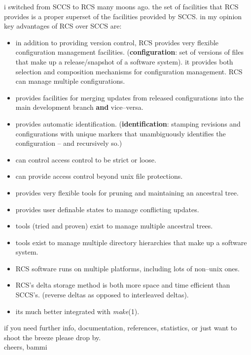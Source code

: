 
\noindent i switched from SCCS to RCS many moons ago. the set of facilities that
RCS provides is a proper superset of the facilities provided by SCCS.
in my opinion key advantages of RCS over SCCS are:
\begin{itemize}
\item in addition to providing version control, RCS provides very flexible
  configuration management facilities. ({\bf configuration}: set of versions
  of files that make up a release/snapshot of a software system). it provides
  both selection and composition mechanisms for configuration management. RCS
can manage multiple configurations.
\item provides facilities for merging updates from released configurations
into the main development branch {\bf and} vice--versa.
\item provides automatic identification. ({\bf identification}: stamping
revisions and configurations with unique markers that unambiguously identifies
the configuration -- and recursively so.)
\item can control access control to be strict or loose.
\item can provide access control beyond unix file protections.
\item provides very flexible tools for pruning and maintaining an ancestral tree.
\item provides user definable states to manage conflicting updates.
\item tools (tried and proven) exist to manage multiple ancestral trees.
\item tools exist to manage multiple directory hierarchies that
make up a software system.
\item RCS software runs on multiple platforms, including lots of non--unix ones.
\item RCS's delta storage method is both more space and time efficient than
SCCS's. (reverse deltas as opposed to interleaved deltas).
\item its much better integrated with {\em make}(1).
\end{itemize}
\noindent if you need further info, documentation, references, statistics, or
just want to shoot the breeze please drop by.\\
cheers, bammi

